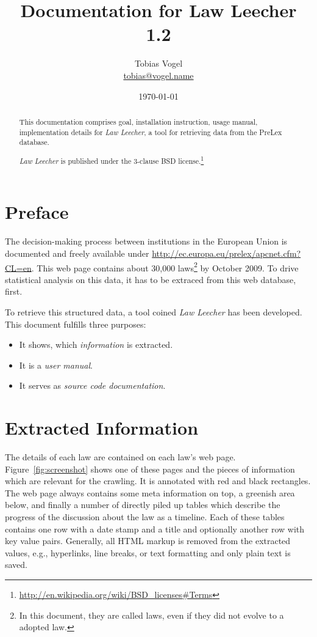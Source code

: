\documentclass{scrartcl}
\newcommand{\theTitle}{Documentation for Law Leecher 1.2}
\newcommand{\theAuthor}{Tobias Vogel}
\begin{document}
\title{\theTitle}
\author{\theAuthor\\\url{tobias@vogel.name}}
\date{\today}

\maketitle

\begin{abstract}
This documentation comprises goal, installation instruction, usage manual, implementation details for \textit{Law Leecher}, a tool for retrieving data from the PreLex database.

\textit{Law Leecher} is published under the 3-clause BSD license.\footnote{\url{http://en.wikipedia.org/wiki/BSD_licenses\#Terms}}
\end{abstract}


\tableofcontents


\section{Preface}
The decision-making process between institutions in the European Union is documented and freely available under \url{http://ec.europa.eu/prelex/apcnet.cfm?CL=en}. This web page contains about 30,000 laws\footnote{In this document, they are called laws, even if they did not evolve to a adopted law.} by October 2009. To drive statistical analysis on this data, it has to be extraced from this web database, first.

To retrieve this structured data, a tool coined \textit{Law Leecher} has been developed. This document fulfills three purposes:

\begin{itemize}
\item It shows, which \textit{information} is extracted.
\item It is a \textit{user manual}.
\item It serves as \textit{source code documentation}.
\end{itemize}



\section{Extracted Information}
The details of each law are contained on each law's web page. Figure~\ref{fig:screenshot} shows one of these pages and the pieces of information which are relevant for the crawling. It is annotated with red and black rectangles. The web page always contains some meta information on top, a greenish area below, and finally a number of directly piled up tables which describe the progress of the discussion about the law as a timeline. Each of these tables contains one row with a date stamp and a title and optionally another row with key value pairs. Generally, all HTML markup is removed from the extracted values, e.g., hyperlinks, line breaks, or text formatting and only plain text is saved.
\end{document}
